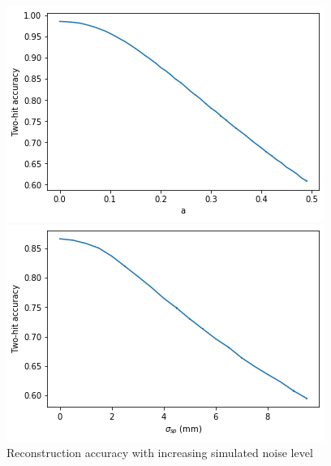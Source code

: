 \begin{figure}
    \centering
    \begin{minipage}{0.49\textwidth} \centering
        \includegraphics[width=\textwidth]{graphs/pi_enNoise_acc.png}
        \end{minipage}
        \begin{minipage}{0.49\textwidth} \centering
        \includegraphics[width=\textwidth]{graphs/pi_spNoise_acc.png}
        \end{minipage}
        \caption{Reconstruction accuracy with increasing simulated noise level}
        \label{fig:sim_acc}
\end{figure}